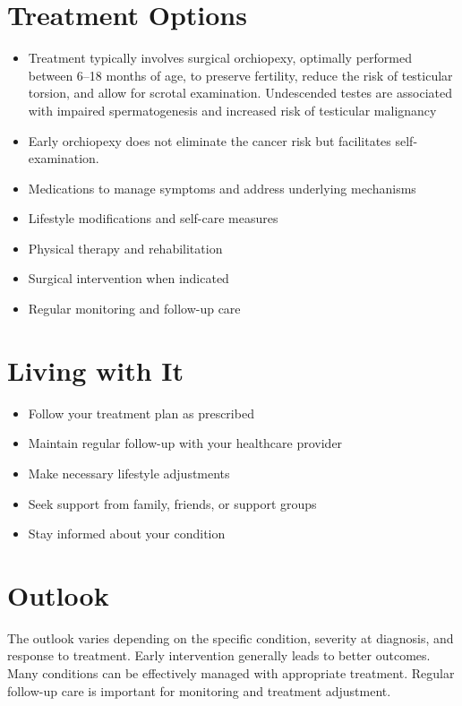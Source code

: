 \section{Treatment Options}
\begin{itemize}[noitemsep]
  \item Treatment typically involves surgical orchiopexy, optimally performed between 6--18 months of age, to preserve fertility, reduce the risk of testicular torsion, and allow for scrotal examination. Undescended testes are associated with impaired spermatogenesis and increased risk of testicular malignancy
  \item Early orchiopexy does not eliminate the cancer risk but facilitates self-examination.
  \item Medications to manage symptoms and address underlying mechanisms
  \item Lifestyle modifications and self-care measures
  \item Physical therapy and rehabilitation
  \item Surgical intervention when indicated
  \item Regular monitoring and follow-up care
\end{itemize}
\section{Living with It}
\begin{itemize}[noitemsep]
  \item Follow your treatment plan as prescribed
  \item Maintain regular follow-up with your healthcare provider
  \item Make necessary lifestyle adjustments
  \item Seek support from family, friends, or support groups
  \item Stay informed about your condition
\end{itemize}
\section{Outlook}
The outlook varies depending on the specific condition, severity at diagnosis, and response to treatment. Early intervention generally leads to better outcomes. Many conditions can be effectively managed with appropriate treatment. Regular follow-up care is important for monitoring and treatment adjustment.
